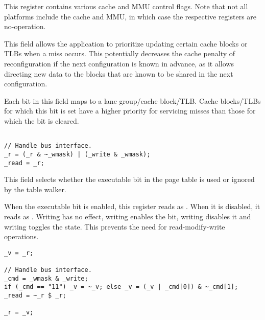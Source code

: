 

This register contains various cache and MMU control flags. Note that not all
platforms include the cache and MMU, in which case the respective registers are
no-operation.

This field allows the application to prioritize updating certain cache blocks or 
TLBs when a miss occurs. This potentially decreases the cache penalty of 
reconfiguration if the next configuration is known in advance, as it allows 
directing new data to the blocks that are known to be shared in the next 
configuration.

Each bit in this field maps to a lane group/cache block/TLB. Cache blocks/TLBs
for which this bit is set have a higher priority for servicing misses than
those for which the bit is cleared.

\declaration{}
\implementation{}
\begin{lstlisting}

// Handle bus interface.
_r = (_r & ~_wmask) | (_write & _wmask);
_read = _r;

\end{lstlisting}

This field selects whether the executable bit in the page table is used or
ignored by the table walker.

When the executable bit is enabled, this register reads as . When it is
disabled, it reads as . Writing  has no effect, writing
 enables the bit, writing  disables it and writing 
toggles the state. This prevents the need for read-modify-write operations.

\declaration{}
\implementation{}
\begin{lstlisting}
_v = _r;

// Handle bus interface.
_cmd = _wmask & _write;
if (_cmd == "11") _v = ~_v; else _v = (_v | _cmd[0]) & ~_cmd[1];
_read = ~_r $ _r;

_r = _v;
\end{lstlisting}

